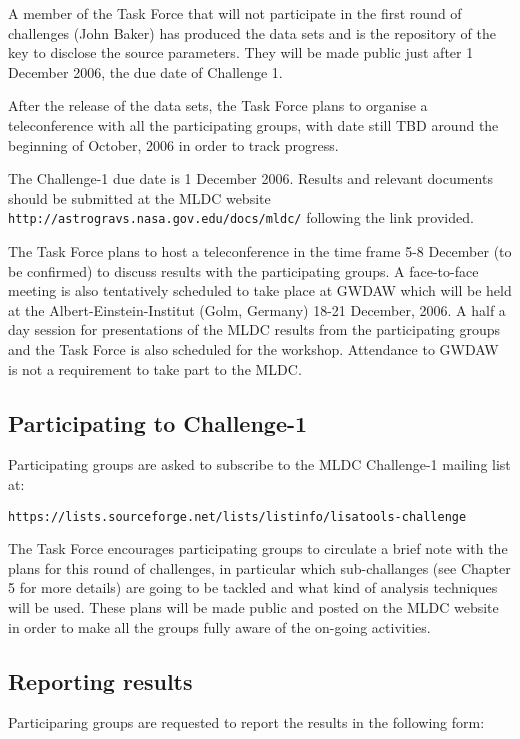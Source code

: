 \documentclass[11pt]{report}
\begin{document}
A member of the Task Force that will not participate in the first round of challenges (John Baker) has produced the data sets and is the repository of the key to disclose the source parameters. They will be made public just after 1 December 2006, the due date of Challenge 1.

After the release of the data sets, the Task Force plans to organise a teleconference with all the participating groups, with date still TBD around the beginning of October, 2006 in order to track progress.

The {\rm Challenge-1 due date is 1 December 2006}. Results and relevant documents should be submitted at the MLDC website {\tt http://astrogravs.nasa.gov.edu/docs/mldc/} following the link provided.

The Task Force plans to host a teleconference in the time frame 5-8 December (to be confirmed) to discuss results with the participating groups. A face-to-face meeting is also tentatively scheduled to take place at GWDAW which will be held at the Albert-Einstein-Institut (Golm, Germany) 18-21 December, 2006. A half a day session for presentations of the MLDC results from the participating groups and the Task Force is also scheduled for the workshop. Attendance to GWDAW is not a requirement to take part to the MLDC.

\subsection{Participating to Challenge-1}

Participating groups are asked to subscribe to the MLDC Challenge-1 mailing list at:

 {\tt https://lists.sourceforge.net/lists/listinfo/lisatools-challenge}

The Task Force encourages participating groups to circulate a brief note with the plans for this round of challenges, in particular which sub-challanges (see Chapter 5 for more details) are going to be tackled and what kind of analysis techniques will be used. These plans will be made public and posted on the MLDC website in order to make all the groups fully aware of the on-going activities.

\subsection{Reporting results}

Participaring groups are requested to report the results in the following form:
\end{document}
